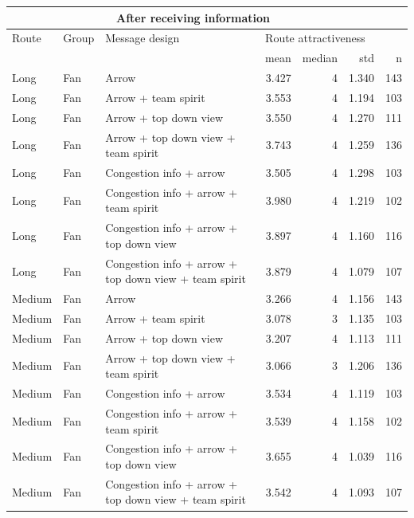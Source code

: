 \begin{table}[H]
\begin{scriptsize}
\begin{tabular}{lllrrrr}
\multicolumn{6}{c}{\textbf{After receiving information}}\\                                                                                                                                           
  \hline
Route & Group & Message design & \multicolumn{3}{l}{Route attractiveness}                                                                                                                                            &  \\ 
 &  & &mean & median & std & n \\
 \hline
 Long & Fan & Arrow & 3.427 & 4 & 1.340 & 143 \\
   Long & Fan & Arrow + team spirit & 3.553 & 4 & 1.194 & 103 \\
   Long & Fan & Arrow + top down view & 3.550 & 4 & 1.270 & 111 \\
   Long & Fan & Arrow + top down view + team spirit & 3.743 & 4 & 1.259 & 136 \\
   Long & Fan & Congestion info + arrow & 3.505 & 4 & 1.298 & 103 \\
   Long & Fan & Congestion info + arrow + team spirit & 3.980 & 4 & 1.219 & 102 \\
   Long & Fan & Congestion info + arrow + top down view & 3.897 & 4 & 1.160 & 116 \\
   Long & Fan & Congestion info + arrow + top down view + team spirit & 3.879 & 4 & 1.079 & 107 \\
   Medium & Fan & Arrow & 3.266 & 4 & 1.156 & 143 \\
   Medium & Fan & Arrow + team spirit & 3.078 & 3 & 1.135 & 103 \\
   Medium & Fan & Arrow + top down view & 3.207 & 4 & 1.113 & 111 \\
   Medium & Fan & Arrow + top down view + team spirit & 3.066 & 3 & 1.206 & 136 \\
   Medium & Fan & Congestion info + arrow & 3.534 & 4 & 1.119 & 103 \\
   Medium & Fan & Congestion info + arrow + team spirit & 3.539 & 4 & 1.158 & 102 \\
   Medium & Fan & Congestion info + arrow + top down view & 3.655 & 4 & 1.039 & 116 \\
   Medium & Fan & Congestion info + arrow + top down view + team spirit & 3.542 & 4 & 1.093 & 107 \\

\end{tabular}
\end{scriptsize}
\end{table}
